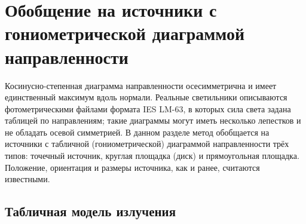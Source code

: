 %
%
%
%
%
%
%
%

\section{Обобщение на источники с гониометрической диаграммой направленности}
\label{sec:ies-method}

Косинусно-степенная диаграмма направленности осесимметрична и имеет единственный максимум вдоль нормали. Реальные светильники описываются фотометрическими файлами формата IES LM-63, в которых сила света задана таблицей по направлениям; такие диаграммы могут иметь несколько лепестков и не обладать осевой симметрией. В данном разделе метод обобщается на источники с табличной (гониометрической) диаграммой направленности трёх типов: точечный источник, круглая площадка (диск) и прямоугольная площадка. Положение, ориентация и размеры источника, как и ранее, считаются известными.

\subsection{Табличная модель излучения}

